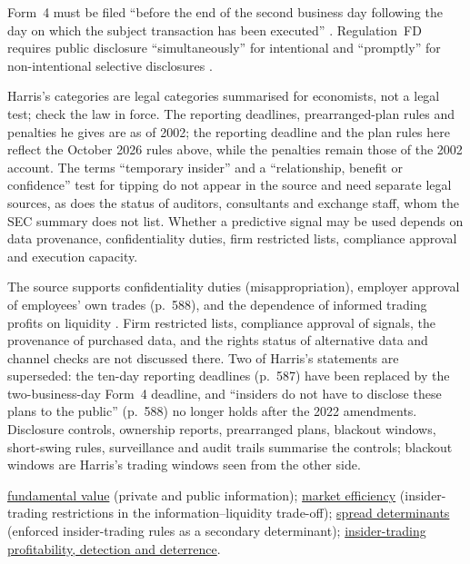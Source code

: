 \begin{qfdefinition}
Form~4 must be filed ``before the end of the second business day following the day on which the subject transaction has been executed'' \citep[para.~(g)(1)]{cfr-240-16a-3}. Regulation~FD requires public disclosure ``simultaneously'' for intentional and ``promptly'' for non-intentional selective disclosures \citep[para.~(a)]{cfr-243-100}.

 Harris's categories are legal categories summarised for economists, not a legal test; check the law in force. The reporting deadlines, prearranged-plan rules and penalties he gives \citep[same chap., pp.~587--591]{alpha-harris} are as of 2002; the reporting deadline and the plan rules here reflect the October 2026 rules above, while the penalties remain those of the 2002 account. The terms ``temporary insider'' and a ``relationship, benefit or confidence'' test for tipping do not appear in the source and need separate legal sources, as does the status of auditors, consultants and exchange staff, whom the SEC summary does not list. Whether a predictive signal may be used depends on data provenance, confidentiality duties, firm restricted lists, compliance approval and execution capacity.

The source supports confidentiality duties (misappropriation), employer approval of employees' own trades (p.~588), and the dependence of informed trading profits on liquidity \citep[chap.~``Informed Traders and Market Efficiency'', box, p.~236]{alpha-harris}. Firm restricted lists, compliance approval of signals, the provenance of purchased data, and the rights status of alternative data and channel checks are not discussed there. Two of Harris's statements are superseded: the ten-day reporting deadlines (p.~587) have been replaced by the two-business-day Form~4 deadline, and ``insiders do not have to disclose these plans to the public'' (p.~588) no longer holds after the 2022 amendments. Disclosure controls, ownership reports, prearranged plans, blackout windows, short-swing rules, surveillance and audit trails summarise the controls; blackout windows are Harris's trading windows seen from the other side.

 \hyperref[def:fundamental-value]{fundamental value} (private and public information); \hyperref[def:market-efficiency]{market efficiency} (insider-trading restrictions in the information--liquidity trade-off); \hyperref[res:spread-determinants]{spread determinants} (enforced insider-trading rules as a secondary determinant); \hyperref[res:insider-trading-deterrence]{insider-trading profitability, detection and deterrence}.

\end{qfdefinition}

